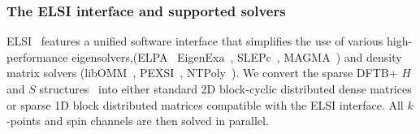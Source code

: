 \documentclass[reprint,onecolumn,superscriptaddress]{revtex4-1}
\newcommand{\dftbp}{DFTB+}
\begin{document}
\subsubsection{The ELSI interface and supported solvers}
\label{sec:elsi}

ELSI~\cite{elsi_yu_2018} features a unified software interface that simplifies
the use of various high-performance eigensolvers,(ELPA~\cite{elpa_marek_2014}
EigenExa~\cite{eigenexa_imamura_2011}, SLEPc~\cite{slepc_hernandez_2005},
MAGMA~\cite{magma_dongarra_2014}) and density matrix solvers
(libOMM~\cite{libomm_corsetti_2014}, PEXSI~\cite{pexsi_lin_2013},
NTPoly~\cite{ntpoly_dawson_2018}). We convert the sparse \dftbp{} $H$ and $S$
structures~\cite{aradi-jpca-2007} into either standard 2D block-cyclic
distributed dense matrices or sparse 1D block distributed matrices compatible
with the ELSI interface. All $k$-points and spin channels are then solved in
parallel.
\end{document}
